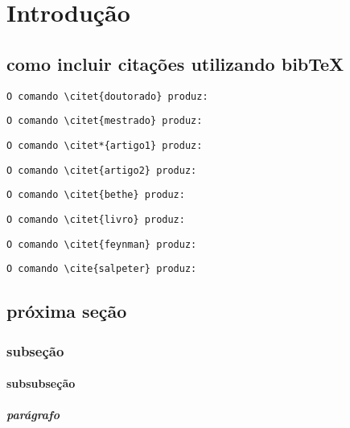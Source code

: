 \chapter{Introdução}
\label{intro}

\section{como incluir citações utilizando bibTeX}

\begin{verbatim}O comando \citet{doutorado} produz:\end{verbatim}
\citet{doutorado}

\begin{verbatim}O comando \citet{mestrado} produz:\end{verbatim}
\citet{mestrado}

\begin{verbatim}O comando \citet*{artigo1} produz:\end{verbatim}
\citet*{artigo1}

\begin{verbatim}O comando \citet{artigo2} produz:\end{verbatim}
\citet{artigo2}

\begin{verbatim}O comando \citet{bethe} produz:\end{verbatim}
\citet{bethe}

\begin{verbatim}O comando \citet{livro} produz:\end{verbatim}
\citet{livro}

\begin{verbatim}O comando \citet{feynman} produz:\end{verbatim}
\citet{feynman}

\begin{verbatim}O comando \cite{salpeter} produz:\end{verbatim}
\cite{salpeter}

\section{próxima seção}

\subsection{subseção}

\subsubsection{subsubseção}

\paragraph{parágrafo}